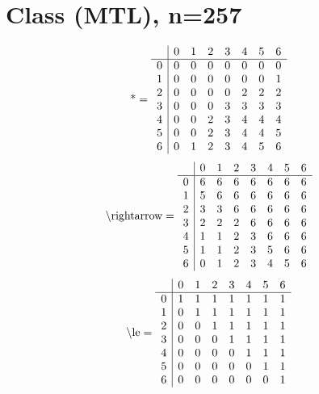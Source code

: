 \documentclass[11pt]{article}
\begin{document}
\section{Class (MTL), n=257}
\[\text{*} = 
\begin{array}{r | r r r r r r r}
 & 0 & 1 & 2 & 3 & 4 & 5 & 6 \\ \hline
0 & 0 & 0 & 0 & 0 & 0 & 0 & 0 \\
1 & 0 & 0 & 0 & 0 & 0 & 0 & 1 \\
2 & 0 & 0 & 0 & 0 & 2 & 2 & 2 \\
3 & 0 & 0 & 0 & 3 & 3 & 3 & 3 \\
4 & 0 & 0 & 2 & 3 & 4 & 4 & 4 \\
5 & 0 & 0 & 2 & 3 & 4 & 4 & 5 \\
6 & 0 & 1 & 2 & 3 & 4 & 5 & 6 \\
\end{array}
\]
\[\text{\textbackslash rightarrow} = 
\begin{array}{r | r r r r r r r}
 & 0 & 1 & 2 & 3 & 4 & 5 & 6 \\ \hline
0 & 6 & 6 & 6 & 6 & 6 & 6 & 6 \\
1 & 5 & 6 & 6 & 6 & 6 & 6 & 6 \\
2 & 3 & 3 & 6 & 6 & 6 & 6 & 6 \\
3 & 2 & 2 & 2 & 6 & 6 & 6 & 6 \\
4 & 1 & 1 & 2 & 3 & 6 & 6 & 6 \\
5 & 1 & 1 & 2 & 3 & 5 & 6 & 6 \\
6 & 0 & 1 & 2 & 3 & 4 & 5 & 6 \\
\end{array}
\]
\[\text{\textbackslash le} = 
\begin{array}{r | r r r r r r r}
 & 0 & 1 & 2 & 3 & 4 & 5 & 6 \\ \hline
0 & 1 & 1 & 1 & 1 & 1 & 1 & 1 \\
1 & 0 & 1 & 1 & 1 & 1 & 1 & 1 \\
2 & 0 & 0 & 1 & 1 & 1 & 1 & 1 \\
3 & 0 & 0 & 0 & 1 & 1 & 1 & 1 \\
4 & 0 & 0 & 0 & 0 & 1 & 1 & 1 \\
5 & 0 & 0 & 0 & 0 & 0 & 1 & 1 \\
6 & 0 & 0 & 0 & 0 & 0 & 0 & 1 \\
\end{array}
\]
\end{document}
